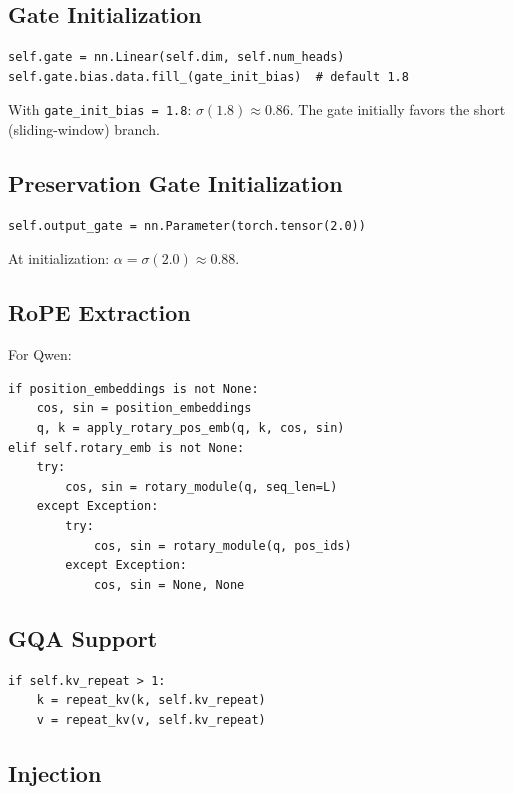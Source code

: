 \subsection{Gate Initialization}

\begin{lstlisting}
self.gate = nn.Linear(self.dim, self.num_heads)
self.gate.bias.data.fill_(gate_init_bias)  # default 1.8
\end{lstlisting}

With \texttt{gate\_init\_bias = 1.8}: $\sigma(1.8) \approx 0.86$. The gate initially 
favors the short (sliding-window) branch.

\subsection{Preservation Gate Initialization}

\begin{lstlisting}
self.output_gate = nn.Parameter(torch.tensor(2.0))
\end{lstlisting}

At initialization: $\alpha = \sigma(2.0) \approx 0.88$.

\subsection{RoPE Extraction}

For Qwen:

\begin{lstlisting}
if position_embeddings is not None:
    cos, sin = position_embeddings
    q, k = apply_rotary_pos_emb(q, k, cos, sin)
elif self.rotary_emb is not None:
    try:
        cos, sin = rotary_module(q, seq_len=L)
    except Exception:
        try:
            cos, sin = rotary_module(q, pos_ids)
        except Exception:
            cos, sin = None, None
\end{lstlisting}

\subsection{GQA Support}

\begin{lstlisting}
if self.kv_repeat > 1:
    k = repeat_kv(k, self.kv_repeat)
    v = repeat_kv(v, self.kv_repeat)
\end{lstlisting}

\subsection{Injection}

